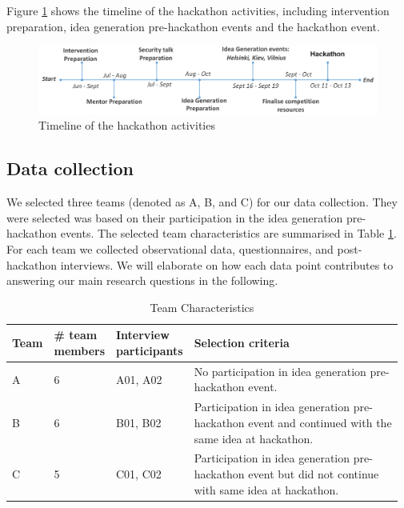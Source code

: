 \documentclass[runningheads]{llncs}
\begin{document}
Figure \ref{Fig:timeline} shows the timeline of the hackathon activities, including intervention preparation, idea generation pre-hackathon events and the hackathon event.
\begin{figure}[hbt!]
\vspace{-5pt}
  \centering
  \includegraphics[width=\linewidth]{timelinehack.pdf}
  \caption{Timeline of the hackathon activities} \label{Fig:timeline} 
 \vspace{-10pt}
\end{figure}

\subsection{Data collection}
We selected three teams (denoted as A, B, and C) for our data collection. They were selected was based on their participation in the idea generation pre-hackathon events. The selected team characteristics are summarised in Table \ref{tab:teamcharacteristics}. For each team we collected observational data, questionnaires, and post-hackathon interviews. We will elaborate on how each data point contributes to answering our main research questions in the following.

\begin{table}[h]
    \caption{Team Characteristics}
    \label{tab:teamcharacteristics}
    \centering
    \begin{tabular}{|p{0.08\linewidth}|p{0.12\linewidth}|p{0.14\linewidth}|p{0.63\linewidth}|} \hline
	 Team & {\#} team members & Interview participants & Selection criteria \\ \hline
      A  & 6& A01, A02 &  No participation in idea generation pre-hackathon event. \\ \hline
      B  & 6 & B01, B02 &  Participation in idea generation pre-hackathon event and continued with the same idea at hackathon. \\ \hline
      C  & 5 & C01, C02 & Participation in idea generation pre-hackathon event but did not continue with same idea at hackathon. \\ \hline
    \end{tabular}
     \vspace{-10pt}
\end{table}
\end{document}
